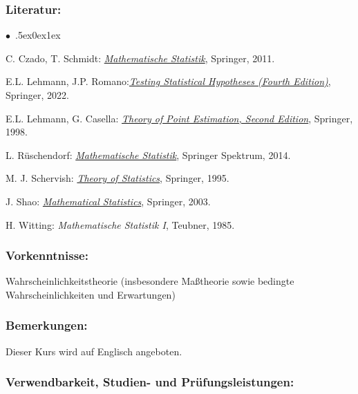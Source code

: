 \documentclass[a4paper,10pt]{article}
\renewenvironment{itemize}{\begin{list}{$\bullet$\ }{\itemsep.5ex\setlength{\topsep}{0.5\itemsep}\parsep0ex\labelsep1ex\settowidth{\labelwidth}{$\bullet$\ }\setlength{\leftmargin}{\labelwidth}\addtolength{\leftmargin}{3ex}\addtolength{\leftmargin}{\labelsep}}}{\end{list}}
\begin{document}
\subsubsection*{\large
    Literatur:
}
\begin{itemize}
\item C. Czado, T. Schmidt: \href{https://link.springer.com/book/10.1007/978-3-642-17261-8}{\emph{Mathematische Statistik}}, Springer, 2011.
\item E.L. Lehmann, J.P. Romano:\href{https://link.springer.com/book/10.1007/978-3-030-70578-7}{\emph{Testing Statistical Hypotheses (Fourth Edition)}}, Springer, 2022.
\item E.L. Lehmann, G. Casella: \href{https://link.springer.com/book/10.1007/b98854}{\emph{Theory of Point Estimation, Second Edition}}, Springer, 1998. 
\item  L. Rüschendorf: \href{https://link.springer.com/book/10.1007/978-3-642-41997-3}{\emph{Mathematische Statistik}}, Springer Spektrum, 2014. 
\item  M. J. Schervish: \href{https://link.springer.com/book/10.1007/978-1-4612-4250-5}{\emph{Theory of Statistics}}, Springer, 1995.
\item J. Shao:  \href{https://link.springer.com/book/10.1007/b97553}{\emph{Mathematical Statistics}}, Springer, 2003.
\item H. Witting: \emph{Mathematische Statistik I}, Teubner, 1985.
\end{itemize}
\subsubsection*{\large
    Vorkenntnisse:
}
Wahrscheinlichkeitstheorie (insbesondere Maßtheorie sowie bedingte Wahrscheinlichkeiten und Erwartungen)
\subsubsection*{\large
    Bemerkungen:
}
Dieser Kurs wird auf Englisch angeboten.
\cleardoublepage
\subsubsection*{\large
    Verwendbarkeit, Studien- und Prüfungsleistungen:
}
\end{document}
